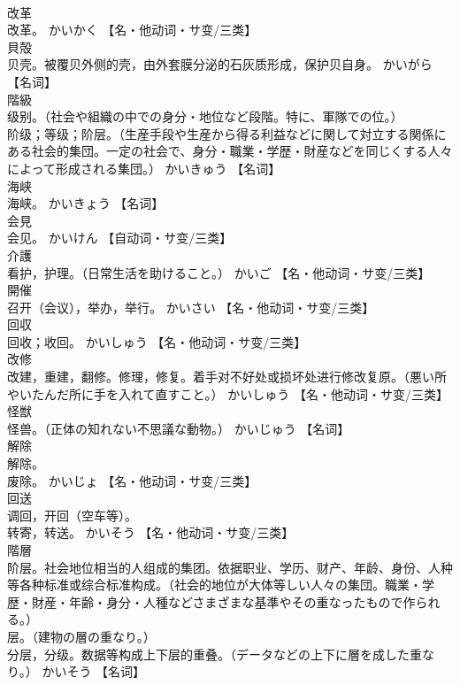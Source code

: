 \documentclass[8pt]{extreport}
\begin{document}
\begin{CJK}{UTF8}{min}
\\	改革	
\\	改革。	かいかく		【名・他动词・サ变/三类】
\\	貝殻	
\\	贝壳。被覆贝外侧的壳，由外套膜分泌的石灰质形成，保护贝自身。	かいがら		【名词】
\\	階級	
\\	级别。（社会や組織の中での身分・地位など段階。特に、軍隊での位。） 
\\	阶级；等级；阶层。（生産手段や生産から得る利益などに関して対立する関係にある社会的集団。一定の社会で、身分・職業・学歴・財産などを同じくする人々によって形成される集団。）	かいきゅう		【名词】
\\	海峡	
\\	海峡。	かいきょう		【名词】
\\	会見	
\\	会见。	かいけん		【自动词・サ变/三类】
\\	介護	
\\	看护，护理。（日常生活を助けること。）	かいご		【名・他动词・サ变/三类】
\\	開催	
\\	召开（会议），举办，举行。	かいさい		【名・他动词・サ变/三类】
\\	回収	
\\	回收；收回。	かいしゅう		【名・他动词・サ变/三类】
\\	改修	
\\	改建，重建，翻修。修理，修复。着手对不好处或损坏处进行修改复原。（悪い所やいたんだ所に手を入れて直すこと。）	かいしゅう		【名・他动词・サ变/三类】
\\	怪獣	
\\	怪兽。（正体の知れない不思議な動物。）	かいじゅう		【名词】
\\	解除	
\\	解除。 
\\	废除。	かいじょ		【名・他动词・サ变/三类】
\\	回送	
\\	调回，开回（空车等）。 
\\	转寄，转送。	かいそう		【名・他动词・サ变/三类】
\\	階層	
\\	阶层。社会地位相当的人组成的集团。依据职业、学历、财产、年龄、身份、人种等各种标准或综合标准构成。（社会的地位が大体等しい人々の集団。職業・学歴・財産・年齢・身分・人種などさまざまな基準やその重なったもので作られる。） 
\\	层。（建物の層の重なり。） 
\\	分层，分级。数据等构成上下层的重叠。（データなどの上下に層を成した重なり。）	かいそう		【名词】

\end{CJK}
\end{document}
